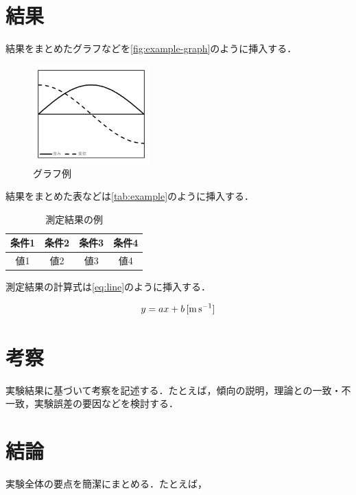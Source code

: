 \documentclass[lualatex,ja=standard]{bxjsarticle}
\begin{document}
\section{結果}

結果をまとめたグラフなどを\autoref{fig:example-graph}のように挿入する．


\begin{figure}[htbp]
  \centering
  \includegraphics[width=0.4\textwidth]{img/BN/graph.png}
  \caption{グラフ例}
  \label{fig:example-graph}
\end{figure}

結果をまとめた表などは\autoref{tab:example}のように挿入する．

\begin{table}[htbp]
  \centering
  \caption{測定結果の例}
  \label{tab:example}
  \begin{tabular}{cccc}
    \toprule
    条件1 & 条件2 & 条件3 & 条件4 \\
    \midrule
    値1 & 値2 & 値3 & 値4 \\
    \bottomrule
  \end{tabular}
\end{table}

測定結果の計算式は\autoref{eq:line}のように挿入する．

\begin{equation}
  y = a x + b \,\text{[\si{\meter\per\second}]}
  \label{eq:line}
\end{equation}

\section{考察}

実験結果に基づいて考察を記述する．たとえば，傾向の説明，理論との一致・不一致，実験誤差の要因などを検討する．

\section{結論}

実験全体の要点を簡潔にまとめる．たとえば，
\end{document}
